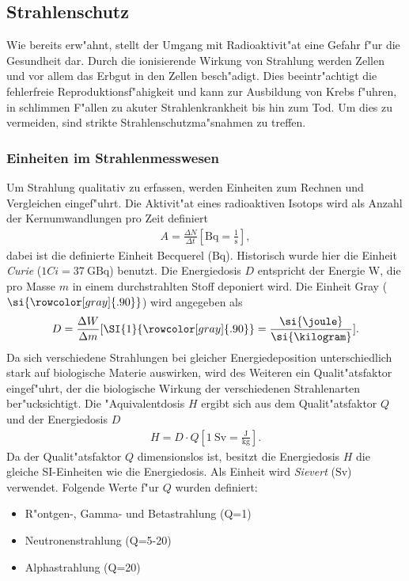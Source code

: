 \documentclass[12pt]{article}
\newcommand{\gray}{\rowcolor[gray]{.90}}
\begin{document}
\subsection{Strahlenschutz}

Wie bereits erw"ahnt, stellt der Umgang mit Radioaktivit"at eine Gefahr f"ur die Gesundheit dar. Durch die ionisierende Wirkung von Strahlung werden Zellen und vor allem das Erbgut in den Zellen besch"adigt. Dies beeintr"achtigt die fehlerfreie Reproduktionsf"ahigkeit und kann zur Ausbildung von Krebs f"uhren, in schlimmen F"allen zu akuter Strahlenkrankheit bis hin zum Tod. Um dies zu vermeiden, sind strikte Strahlenschutzma"snahmen zu treffen. 

\subsubsection{Einheiten im Strahlenmesswesen}
\label{ch:einheiten}
Um Strahlung qualitativ zu erfassen, werden Einheiten zum Rechnen und Vergleichen eingef"uhrt. Die Aktivit"at eines radioaktiven Isotops wird als Anzahl der Kernumwandlungen pro Zeit definiert
\begin{align}
A=\frac{\Delta N}{\Delta t} [\si{\becquerel}=\frac{1}{\si{\second}}],
\end{align}
dabei ist die definierte Einheit Becquerel ($\si{\becquerel}$). Historisch wurde hier die Einheit \textit{Curie} ($1Ci=\SI{37}{\giga\becquerel}$) benutzt.
Die Energiedosis $D$ entspricht der Energie W, die pro Masse $m$ in einem durchstrahlten Stoff deponiert wird. Die Einheit Gray ($\si{\gray}$) wird angegeben als
\begin{align}
D=\frac{\Delta W}{\Delta m} [\SI{1}{\gray}=\frac{\si{\joule}}{\si{\kilogram}}].
\end{align}
Da sich verschiedene Strahlungen bei gleicher Energiedeposition unterschiedlich stark auf biologische Materie auswirken, wird des Weiteren ein Qualit"atsfaktor eingef"uhrt, der die biologische Wirkung der verschiedenen Strahlenarten ber"ucksichtigt. Die "Aquivalentdosis $H$ ergibt sich aus dem Qualit"atsfaktor $Q$ und der Energiedosis $D$
\begin{align}
H=D\cdot Q [\SI{1}{\sievert}=\frac{\si{\joule}}{\si{\kilogram}}].
\end{align} 
Da der Qualit"atsfaktor $Q$ dimensionslos ist, besitzt die Energiedosis $H$ die gleiche SI-Einheiten wie die Energiedosis. Als Einheit wird \textit{Sievert} ($\si{\sievert}$) verwendet. Folgende Werte f"ur $Q$ wurden definiert:
\begin{itemize}
	\item R"ontgen-, Gamma- und Betastrahlung (Q=1)
	\item Neutronenstrahlung (Q=5-20)
	\item Alphastrahlung (Q=20)
\end{itemize}
\end{document}
